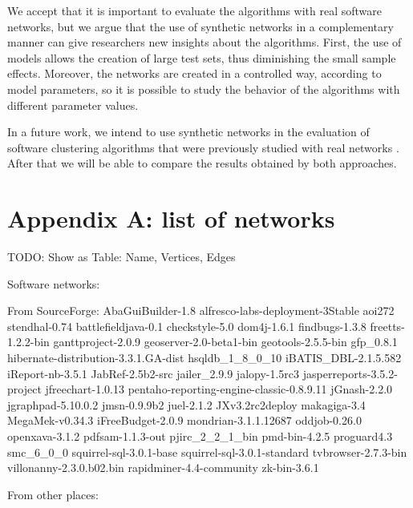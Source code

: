 
We accept that it is important to evaluate the algorithms with real software
networks, but we argue that the use of synthetic networks in a complementary
manner can give researchers new insights about the algorithms. First, the use of
models allows the creation of large test sets, thus diminishing the small sample
effects. Moreover, the networks are created in a controlled way, according to
model parameters, so it is possible to study the behavior of the algorithms with
different parameter values.

In a future work, we intend to use synthetic networks in the evaluation of
software clustering algorithms that were previously studied with real networks
\cite{Wu2005}. After that we will be able to compare the results obtained by
both approaches.

\section{Appendix A: list of networks}

TODO: Show as Table: Name, Vertices, Edges

Software networks:

From SourceForge:
AbaGuiBuilder-1.8
alfresco-labs-deployment-3Stable
aoi272
stendhal-0.74
battlefieldjava-0.1
checkstyle-5.0
dom4j-1.6.1
findbugs-1.3.8
freetts-1.2.2-bin
ganttproject-2.0.9
geoserver-2.0-beta1-bin
geotools-2.5.5-bin
gfp\_0.8.1
hibernate-distribution-3.3.1.GA-dist
hsqldb\_1\_8\_0\_10
iBATIS\_DBL-2.1.5.582
iReport-nb-3.5.1
JabRef-2.5b2-src
jailer\_2.9.9
jalopy-1.5rc3
jasperreports-3.5.2-project
jfreechart-1.0.13
pentaho-reporting-engine-classic-0.8.9.11
jGnash-2.2.0
jgraphpad-5.10.0.2
jmsn-0.9.9b2
juel-2.1.2
JXv3.2rc2deploy
makagiga-3.4
MegaMek-v0.34.3
iFreeBudget-2.0.9
mondrian-3.1.1.12687
oddjob-0.26.0
openxava-3.1.2
pdfsam-1.1.3-out
pjirc\_2\_2\_1\_bin
pmd-bin-4.2.5
proguard4.3
smc\_6\_0\_0
squirrel-sql-3.0.1-base
squirrel-sql-3.0.1-standard
tvbrowser-2.7.3-bin
villonanny-2.3.0.b02.bin
rapidminer-4.4-community
zk-bin-3.6.1

From other places:

